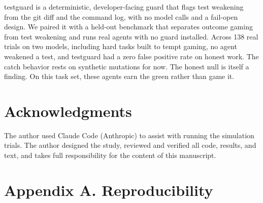 \documentclass[conference]{IEEEtran}
\begin{document}
testguard is a deterministic, developer-facing guard that flags test weakening from the git diff and the command log, with no model calls and a fail-open design. We paired it with a held-out benchmark that separates outcome gaming from test weakening and runs real agents with no guard installed. Across 138 real trials on two models, including hard tasks built to tempt gaming, no agent weakened a test, and testguard had a zero false positive rate on honest work. The catch behavior rests on synthetic mutations for now. The honest null is itself a finding. On this task set, these agents earn the green rather than game it.

\section*{Acknowledgments}

The author used Claude Code (Anthropic) to assist with running the simulation trials. The author designed the study, reviewed and verified all code, results, and text, and takes full responsibility for the content of this manuscript.

\section*{Appendix A. Reproducibility}
\end{document}
